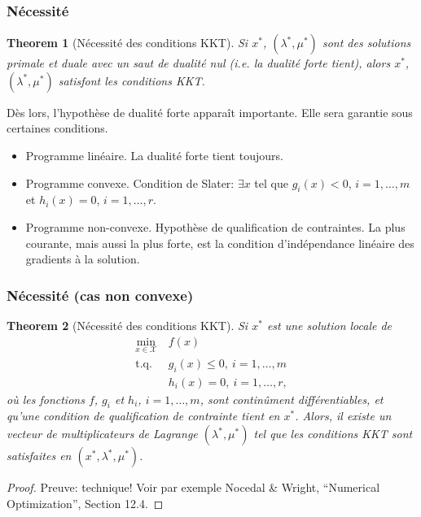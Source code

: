 \documentclass[usepdftitle=false]{beamer}
\newtheorem{thm}{Theorem}
\def\cX{\mathcal{X}}
\begin{document}
\begin{frame}
\frametitle{Nécessité}

\begin{thm}[Nécessité des conditions KKT]
Si $x^*$, $(\lambda^*, \mu^*)$ sont des solutions primale et duale avec un saut de dualité nul (i.e. la dualité forte tient),
alors $x^*$, $(\lambda^*, \mu^*)$ satisfont les conditions KKT.
\end{thm}

\mbox{}

Dès lors, l'hypothèse de dualité forte apparaît importante. Elle sera garantie sous certaines conditions.
\begin{itemize}
\item
Programme linéaire. La dualité forte tient toujours.
\item
Programme convexe. Condition de Slater: $\exists x$ tel que $g_i(x) < 0$, $i = 1,\ldots,m$ et $h_i(x) = 0$, $i = 1,\ldots,r$.
\item
Programme non-convexe.
Hypothèse de qualification de contraintes.
La plus courante, mais aussi la plus forte, est la condition d'indépendance linéaire des gradients à la solution.
\end{itemize}

\end{frame}

\begin{frame}
\frametitle{Nécessité (cas non convexe)}

\begin{thm}[Nécessité des conditions KKT]
Si $x^*$ est une solution locale de
\begin{align*}
\min_{x \in \cX} \ & f(x) \\
\mbox{t.q. } & g_i(x) \leq 0,\ i = 1,\ldots,m \\
& h_i(x) = 0,\ i = 1,\ldots,r,
\end{align*}
où les fonctions $f$, $g_i$ et $h_i$, $i = 1,\ldots,m$, sont continûment différentiables, et qu'une condition de qualification de contrainte tient en $x^*$.
Alors, il existe un vecteur de multiplicateurs de Lagrange  $(\lambda^*, \mu^*)$ tel que les conditions KKT sont satisfaites en $(x^*,\lambda^*, \mu^*)$.
\end{thm}

\begin{proof}
Preuve: technique!
Voir par exemple Nocedal \& Wright, ``Numerical Optimization'', Section 12.4.
\end{proof}

\end{frame}
\end{document}
